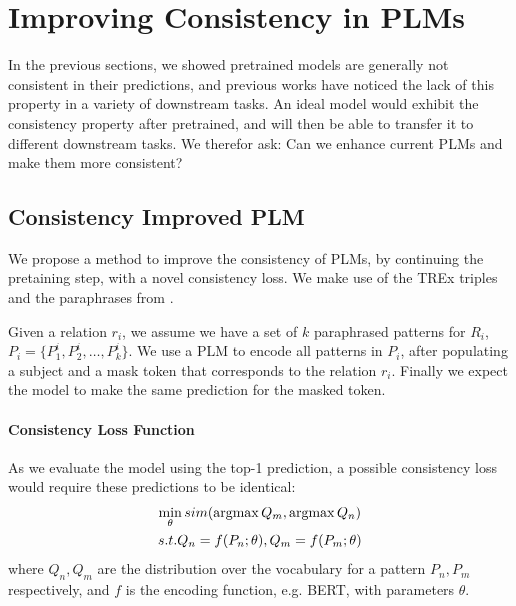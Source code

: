 \section{Improving Consistency in PLMs}
\label{sec:adding_consistency}

In the previous sections, we showed pretrained models are generally not consistent in their predictions, and previous works have noticed the lack of this property in a variety of downstream tasks.
An ideal model would exhibit the consistency property after pretrained, and will then be able to transfer it to different downstream tasks. We therefor ask:
Can we enhance current PLMs and make them more consistent?

\subsection{Consistency Improved PLM}
We propose a method to improve the consistency of PLMs, by continuing the pretaining step, with a novel consistency loss. %
We make use of the TREx triples and the paraphrases from \resource{}.

Given a relation $r_i$, we
assume we have a set of $k$ paraphrased patterns for $R_i$,
$P_i=\{P_1^i, P_2^i, \dots, P_k^i\}$.
We use a PLM to encode all patterns in $P_i$, after populating a subject and a mask token that corresponds to the relation $r_i$. Finally we expect the model to make the same prediction for the masked token.


\paragraph{Consistency Loss Function}
As we evaluate the model using the top-1 prediction, a possible consistency loss would require these predictions to be identical:
\begin{gather*} 
\min_{\theta} sim(\operatorname*{argmax} Q_m, \operatorname*{argmax} Q_n)\\
s.t. Q_n = f(P_n; \theta), Q_m = f(P_m; \theta)
\end{gather*}
where $Q_n,Q_m$ are the distribution over the vocabulary for a pattern $P_n,P_m$ respectively, and $f$ is the encoding function, e.g. BERT, with parameters $\theta$.


